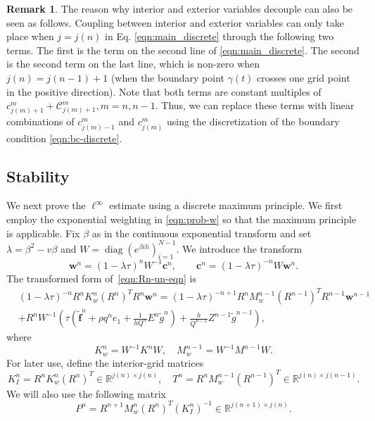\documentclass[11pt,reqno]{amsart}
\theoremstyle{plain}
\theoremstyle{definition}
\newtheorem{remark}[theorem]{Remark}
\numberwithin{equation}{section}
\newcommand{\paren}[1]{\left(#1\right)}
\newcommand{\wt}[1]{\widetilde{#1}}
\newcommand{\bm}[1]{\boldsymbol{#1}}
\newcommand{\R}{\mathbb{R}}
\newcommand{\Corr}{\mathcal C}
\begin{document}
\begin{remark}
The reason why interior and exterior variables decouple can also be seen as follows. Coupling between interior and exterior variables can only take place when $j=j(n)$ in Eq. \eqref{eqn:main_discrete} through the following two terms. The first is the term on the second line of \eqref{eqn:main_discrete}. The second is the second term on the last line, which is non-zero when $j(n)=j(n-1)+1$ (when the boundary point $\gamma(t)$ crosses one grid point in the positive direction). Note that both terms are constant multiples of $c_{j(m)+1}^m+\Corr_{j(m)+1}^m, m=n,n-1$. Thus, we can replace these terms with linear combinations of $c_{j(m)-1}^m$ and $c_{j(m)}^m$ using the discretization of the boundary condition \eqref{eqn:bc-discrete}.
\end{remark}

\subsection{Stability}

We next prove the $\ell^\infty$ estimate using a discrete maximum principle. We first employ the exponential weighting in \eqref{eqn:prob-w} so that the maximum principle is applicable. Fix $\beta$ as in the continuous exponential transform and set $\lambda=\beta^2-v\beta$ and
$W=\operatorname{diag}(e^{\beta ih})_{i=1}^{N-1}$. We introduce the transform
\begin{equation}\label{eqn:weighted-transform}
    \bm w^n = (1-\lambda\tau)^n W^{-1}\bm c^n,
    \qquad
    \bm c^n = (1-\lambda\tau)^{-n}W\bm w^n .
\end{equation}
The transformed form of~\eqref{eqn:Rn-un-eqn} is
\begin{equation}\label{eqn:w-eqn}
\begin{aligned}
    &\paren{1-\lambda \tau}^{-n} R^n K_w^n (R^n)^T R^n \bm  w^n =  \paren{1-\lambda \tau}^{-n+1} R^n M_w^{n-1} (R^{n-1})^T R^{n-1} \bm  w^{n-1} \\
    &+ R^nW^{-1}\paren{ \tau \paren{\wt{\bm f}^n + \rho  q^n e_1 + \frac{1}{h Q^n} E^n \wt g^n} + \frac{h}{Q^{n-1}}  Z^{n-1} \wt g^{n-1} },
\end{aligned}
\end{equation}
where
\begin{equation}
    K_w^n = W^{-1} K^n W, \quad M_w^{n-1} = W^{-1} M^{n-1} W.
\end{equation}
For later use, define the interior-grid matrices
\begin{equation}\label{eqn:transfer-matrices}
    K_I^n = R^nK_w^n(R^n)^T\in\R^{j(n)\times j(n)},\quad
    T^n = R^nM_w^{n-1}(R^{n-1})^T\in\R^{j(n)\times j(n-1)}.
\end{equation}
We will also use the following matrix
\begin{equation}
    P^n=R^{n+1}M_w^n(R^n)^T(K_I^n)^{-1}
    \in\R^{j(n+1)\times j(n)}.
\end{equation}
\end{document}
